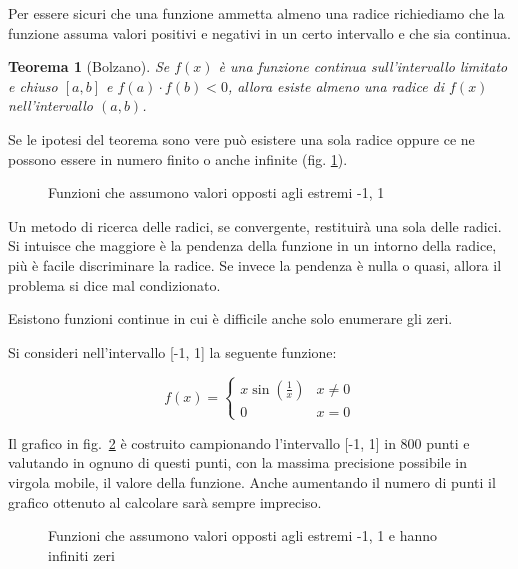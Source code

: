\documentclass[12pt]{article}
\theoremstyle{plain}%
\newtheorem{thm}{Teorema}[section]
\theoremstyle{definition}
\theoremstyle{remark}
\begin{document}
Per essere sicuri che una funzione ammetta almeno una radice richiediamo che la funzione assuma valori positivi e negativi in un certo intervallo e che sia continua.

\begin{thm}[Bolzano]
Se $f (x)$ è una funzione continua sull'intervallo limitato e chiuso $[a, b]$ e $f (a) \cdot f (b) < 0$, allora esiste almeno una radice di $f (x)$ nell'intervallo $(a, b)$.
\end{thm}

Se le ipotesi del teorema sono vere può esistere una sola radice oppure ce ne possono essere in numero finito o anche infinite (fig. \ref{fig:ipotesibolzano}).

\begin{figure}[!htbp]
    \centering
    
    \caption{Funzioni che assumono valori opposti agli estremi -1, 1}
    \label{fig:ipotesibolzano}
\end{figure}

Un metodo di ricerca delle radici, se convergente, restituirà una sola delle radici.
Si intuisce che maggiore è la pendenza della funzione in un intorno della radice, più è facile discriminare la radice. Se invece la pendenza è nulla o quasi, allora il problema si dice mal condizionato.

Esistono funzioni continue in cui è difficile anche solo enumerare gli zeri.

Si consideri nell'intervallo [-1, 1] la seguente funzione:

\begin{equation*}
    f(x) =
    \begin{cases}
        x \sin(\frac{1}{x}) & x \neq 0\\
        0                   & x = 0
    \end{cases}
\end{equation*}

Il grafico in fig.~\ref{fig:tantizeri} è costruito campionando l'intervallo [-1, 1] in 800 punti e
valutando in ognuno di questi punti, con la massima precisione possibile in virgola mobile, il
valore della funzione.
Anche aumentando il numero di punti il grafico ottenuto al calcolare sarà sempre impreciso.

\begin{figure}[!htbp]
    \centering
    
    \caption{Funzioni che assumono valori opposti agli estremi -1, 1 e hanno infiniti zeri}
    \label{fig:tantizeri}
\end{figure}
\end{document}
